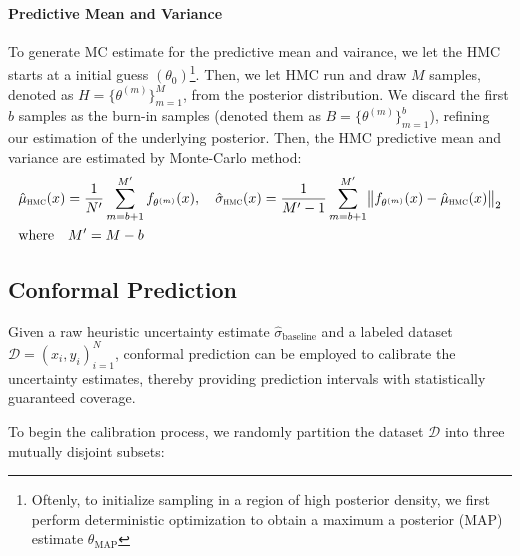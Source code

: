 \documentclass[preprint,12pt]{elsarticle}
\begin{document}
\paragraph{Predictive Mean and Variance}
To generate MC estimate for the predictive mean and vairance, we let the HMC starts at a initial guess $(\theta_0)$\footnote{Oftenly, to initialize sampling in a region of high posterior density, we first perform deterministic optimization to obtain a maximum a posterior (MAP) estimate $\theta_{\text{MAP}}$}. Then, we let HMC run and draw $M$ samples, denoted as $H = \{\theta^{(m)}\}_{m=1}^M$, from the posterior distribution. We discard the first $b$ samples as the burn-in samples (denoted them as $B = \{\theta^{(m)}\}_{m=1}^b$), refining our estimation of the underlying posterior. Then, the HMC predictive mean and variance are estimated by Monte-Carlo method:
\begin{equation}
    \begin{aligned}
        &\hat\mu_{\textsc{hmc}}(x)
        =
        \frac{1}{N'}\sum_{m=b+1}^{M'} f_{\theta^{(m)}}(x),
        \quad
        \hat\sigma_{\textsc{hmc}}(x)
        =
        \frac{1}{M'-1}\sum_{m=b+1}^{M'}
        \bigl\| f_{\theta^{(m)}}(x) - \hat\mu_{\textsc{hmc}}(x) \bigr\|_{2} \\
        &\text{where} \quad
        M' = M - b
    \end{aligned}
\label{eq:hmc_pred_mean_var} 
\end{equation}


\subsection{Conformal Prediction}
\label{sec:sub:vanilla_cp}
Given a raw heuristic uncertainty estimate $\hat \sigma_{\text{baseline}}$ and a labeled dataset $\mathcal{D} = {(x_i, y_i)}_{i=1}^{N}$, conformal prediction can be employed to calibrate the uncertainty estimates, thereby providing prediction intervals with statistically guaranteed coverage.

To begin the calibration process, we randomly partition the dataset $\mathcal{D}$ into three mutually disjoint subsets:
\end{document}
